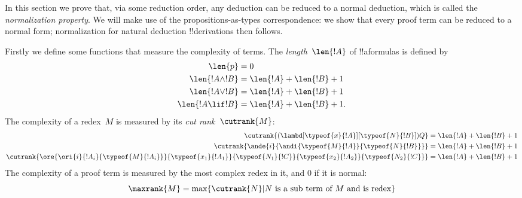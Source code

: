 \documentclass[../../../include/open-logic-section]{subfiles}
\begin{document}


In this section we prove that, via some reduction order, any deduction
can be reduced to a normal deduction, which is called the
\emph{normalization property}. We will make use of the
propositions-as-types correspondence: we show that every proof term
can be reduced to a normal form; normalization for natural deduction
!!{derivation}s then follows.

Firstly we define some functions that measure the complexity of terms.
The \emph{length}~$\len{!A}$ of !!a{formula}s is defined by
\begin{align*}
  \len{p} &= 0\\
  \len{!A \land !B} &= \len{!A} + \len{!B} + 1\\
  \len{!A \lor !B} &= \len{!A} + \len{!B} + 1 \\
  \len{!A \lif !B} &= \len{!A} + \len{!B} + 1.
\end{align*}
The complexity of a redex~$M$ is measured by its \emph{cut
  rank}~$\cutrank{M}$:
\begin{align*}
  \cutrank{(\lambd[\typeof{x}{!A}][\typeof{N}{!B}])Q} &=
  \len{!A} + \len{!B} + 1 \\
  \cutrank{\ande{i}{\andi{\typeof{M}{!A}}{\typeof{N}{!B}}}} &=
  \len{!A} + \len{!B} + 1 \\
  \cutrank{\ore{\ori{i}{!A_{i}}{\typeof{M}{!A_i}}}
    {\typeof{x_1}{!A_1}}{\typeof{N_1}{!C}}
    {\typeof{x_2}{!A_2}}{\typeof{N_2}{!C}}} &=
  \len{!A} + \len{!B} + 1
\end{align*}
The complexity of a proof term is measured by the most complex
redex in it, and $0$ if it is normal:
\[
  \maxrank{M} = \max \{\cutrank{N} | N \text{ is a sub term of } M \text{
    and is redex}\}
\]
\end{document}
